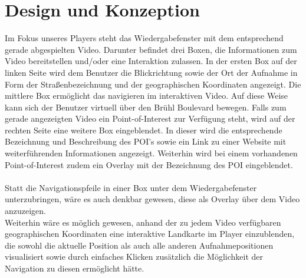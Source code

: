 \chapter{Design und Konzeption}
Im Fokus unseres Players steht das Wiedergabefenster mit dem entsprechend gerade abgespielten Video. Darunter befindet drei Boxen, die Informationen zum Video bereitstellen und/oder eine Interaktion zulassen. In der ersten Box auf der linken Seite wird dem Benutzer die Blickrichtung sowie der Ort der Aufnahme in Form der Straßenbezeichnung und der geographischen Koordinaten angezeigt. Die mittlere Box ermöglicht das navigieren im interaktiven Video. Auf diese Weise kann sich der Benutzer virtuell über den Brühl Boulevard bewegen. Falls zum gerade angezeigten Video ein Point-of-Interest zur Verfügung steht, wird auf der rechten Seite eine weitere Box eingeblendet. In dieser wird die entsprechende Bezeichnung und Beschreibung des POI's sowie ein Link zu einer Website mit weiterführenden Informationen angezeigt. Weiterhin wird bei einem vorhandenen Point-of-Interest zudem ein Overlay mit der Bezeichnung des POI eingeblendet.\\ \\
Statt die Navigationspfeile in einer Box unter dem Wiedergabefenster unterzubringen, wäre es auch denkbar gewesen, diese als Overlay über dem Video anzuzeigen. \\
Weiterhin wäre es möglich gewesen, anhand der zu jedem Video verfügbaren geographischen Koordinaten eine interaktive Landkarte im Player einzublenden, die sowohl die aktuelle Position als auch alle anderen Aufnahmepositionen visualisiert sowie durch einfaches Klicken zusätzlich die Möglichkeit der Navigation zu diesen ermöglicht hätte.



